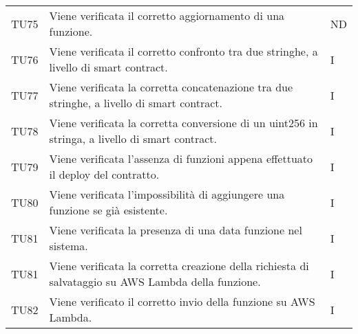 \begin{longtable}{|C{1.5cm}|C{10cm}|C{1.5cm}|}
	TU75 &
	Viene verificata il corretto aggiornamento di una funzione.  &
	ND \\

	TU76 &
	Viene verificata il corretto confronto tra due stringhe, a livello di smart contract.  &
	I \\

	TU77 &
	Viene verificata la corretta concatenazione tra due stringhe, a livello di smart contract.  &
	I \\

	TU78 &
	Viene verificata la corretta conversione di un uint256 in stringa, a livello di smart contract.  &
	I \\

	TU79 &
	Viene verificata l'assenza di funzioni appena effettuato il deploy del contratto.  &
	I \\

	TU80 &
	Viene verificata l'impossibilità di aggiungere una funzione se già esistente.  &
	I \\

	TU81 &
	Viene verificata la presenza di una data funzione nel sistema.  &
	I \\

	TU81 &
	Viene verificata la corretta creazione della richiesta di salvataggio su AWS Lambda della funzione.  &
	I \\

	TU82 &
	Viene verificato il corretto invio della funzione su AWS Lambda.  &
	I \\


\end{longtable}
